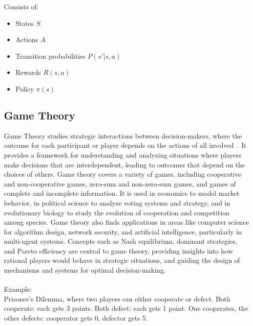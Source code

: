 \documentclass[12pt]{article}
\begin{document}
Consists of:
\begin{itemize}
    \item States \( S \)
    \item Actions \( A \)
    \item Transition probabilities \( P(s'|s,a) \)
    \item Rewards \( R(s,a) \)
    \item Policy \( \pi(s) \)
\end{itemize}

\subsection{Game Theory}
Game Theory studies strategic interactions between decision-makers, where the outcome
for each participant or player depends on the actions of all involved~\cite{osborne1994course}. It provides a
framework for understanding and analyzing situations where players make decisions
that are interdependent, leading to outcomes that depend on the choices of others.
Game theory covers a variety of games, including cooperative and non-cooperative
games, zero-sum and non-zero-sum games, and games of complete and incomplete
information. It is used in economics to model market behavior, in political science
to analyze voting systems and strategy, and in evolutionary biology to study the
evolution of cooperation and competition among species. Game theory also finds
applications in areas like computer science for algorithm design, network security,
and artificial intelligence, particularly in multi-agent systems. Concepts such as
Nash equilibrium, dominant strategies, and Pareto efficiency are central to game
theory, providing insights into how rational players would behave in strategic
situations, and guiding the design of mechanisms and systems for optimal
decision-making.\\
\\
Example:\\
Prisoner's Dilemma, where two players can either cooperate or defect.
Both cooperate: each gets 3 points. Both defect: each gets 1 point.
One cooperates, the other defects: cooperator gets 0, defector gets 5.
\end{document}

